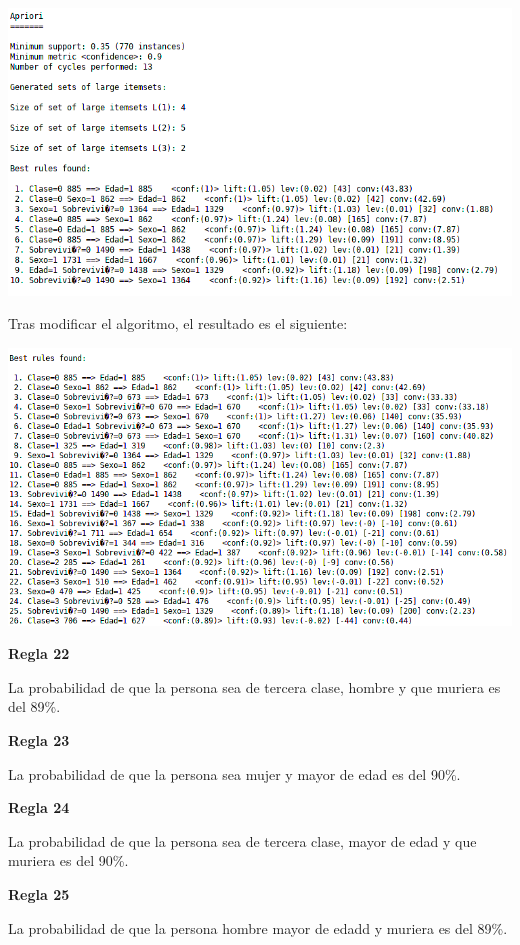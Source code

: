 \documentclass{article}
\begin{document}
\begin{center}
\includegraphics[scale=0.5]{images/titanic.png}
\end{center}

Tras modificar el algoritmo, el resultado es el siguiente:

\begin{center}
\includegraphics[scale=0.5]{images/mod.png}
\end{center}

\textbf{Regla 22}

La probabilidad de que la persona sea de tercera clase, hombre y que muriera es del 89\%.

\textbf{Regla 23}

La probabilidad de que la persona sea mujer y mayor de edad es del 90\%.

\textbf{Regla 24}

La probabilidad de que la persona sea de tercera clase, mayor de edad y que muriera es del 90\%.

\textbf{Regla 25}

La probabilidad de que la persona hombre mayor de edadd y muriera es del 89\%.
\end{document}

